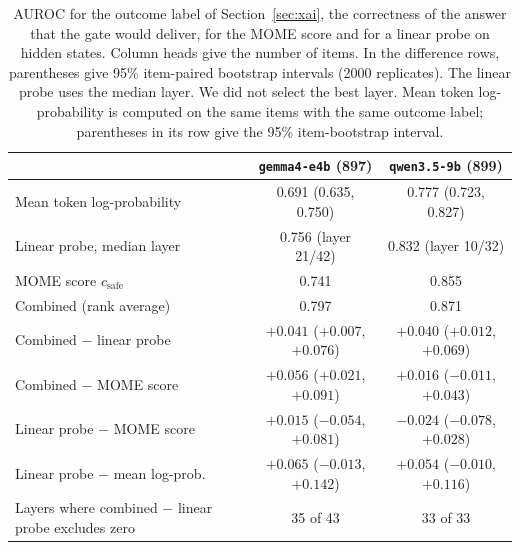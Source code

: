 \begin{table}[t]
\small\setlength{\tabcolsep}{3pt}
\caption{AUROC for the outcome label of Section~\ref{sec:xai}, the correctness of the answer that the gate would deliver, for the MOME score and for a linear probe on hidden states. Column heads give the number of items. In the difference rows, parentheses give 95\% item-paired bootstrap intervals (2000 replicates). The linear probe uses the median layer. We did not select the best layer. Mean token log-probability is computed on the same items with the same outcome label; parentheses in its row give the 95\% item-bootstrap interval.\label{tab:xai}}
\begin{tabularx}{\textwidth}{lCC}
\toprule
 & \textbf{\texttt{gemma4-e4b} (897)} & \textbf{\texttt{qwen3.5-9b} (899)} \\
\midrule
Mean token log-probability & 0.691 (0.635, 0.750) & 0.777 (0.723, 0.827) \\
Linear probe, median layer & 0.756 (layer 21/42) & 0.832 (layer 10/32) \\
MOME score $c_{\mathrm{safe}}$ & 0.741 & 0.855 \\
Combined (rank average) & 0.797 & 0.871 \\
\midrule
Combined $-$ linear probe & $+0.041$ ($+0.007$, $+0.076$) & $+0.040$ ($+0.012$, $+0.069$) \\
Combined $-$ MOME score & $+0.056$ ($+0.021$, $+0.091$) & $+0.016$ ($-0.011$, $+0.043$) \\
Linear probe $-$ MOME score & $+0.015$ ($-0.054$, $+0.081$) & $-0.024$ ($-0.078$, $+0.028$) \\
Linear probe $-$ mean log-prob. & $+0.065$ ($-0.013$, $+0.142$) & $+0.054$ ($-0.010$, $+0.116$) \\
\midrule
Layers where combined $-$ linear probe excludes zero & 35 of 43 & 33 of 33 \\
\bottomrule
\end{tabularx}
\end{table}
